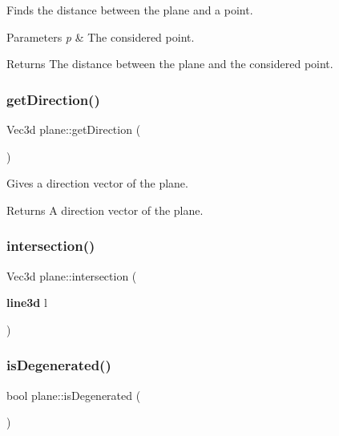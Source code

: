 Finds the distance between the plane and a point. 


\begin{DoxyParams}{Parameters}
{\em p} & The considered point. \\
\hline
\end{DoxyParams}
\begin{DoxyReturn}{Returns}
The distance between the plane and the considered point. 
\end{DoxyReturn}
\mbox{\label{classplane_ace51184307674051addc6211b04eb396}} 
\subsubsection{get\+Direction()}
{\footnotesize\ttfamily Vec3d plane\+::get\+Direction (\begin{DoxyParamCaption}{ }\end{DoxyParamCaption})}



Gives a direction vector of the plane. 

\begin{DoxyReturn}{Returns}
A direction vector of the plane. 
\end{DoxyReturn}
\mbox{\label{classplane_ac6d9ffbd756292a7b9378794eed93936}} 
\subsubsection{intersection()}
{\footnotesize\ttfamily Vec3d plane\+::intersection (\begin{DoxyParamCaption}\item[{\textbf{ line3d}}]{l }\end{DoxyParamCaption})}

\mbox{\label{classplane_a09f0be78b9c809866bca9f9b744f046e}} 
\subsubsection{is\+Degenerated()}
{\footnotesize\ttfamily bool plane\+::is\+Degenerated (\begin{DoxyParamCaption}{ }\end{DoxyParamCaption})}



